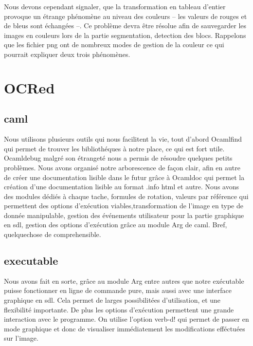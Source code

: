 \documentclass[]{report}
\begin{document}
        Nous devons cependant signaler, que la transformation en tableau d'entier provoque un étrange phénomène au niveau des
        couleurs -- les valeurs de rouges et de bleus sont échangées --. Ce problème devra être résolue afin de sauvegarder
        les images en couleurs lors de la partie segmentation, detection des blocs. Rappelons que les fichier png ont de
        nombreux modes de gestion de la couleur ce qui pourrait expliquer deux trois phénomènes.

        \section{OCRed}
        \subsection{caml}
         Nous utilisons plusieurs outils qui nous facilitent la vie, tout d'abord Ocamlfind qui permet de trouver les bibliothéques à notre place, ce qui est fort utile. Ocamldebug malgré son étrangeté nous a permis de résoudre quelques petits problèmes.
         Nous avons organisé notre arborescence de façon clair, afin en autre de créer une documentation lisible dans le futur grâce à Ocamldoc qui permet la création d'une documentation lisible au format .info html et autre.
         Nous avons des modules dédiés à chaque tache, formules de rotation, valeurs par référence qui permettent des options d'exécution viables,transformation de l'image en type de donnée manipulable, gestion des événements utilisateur pour la partie graphique en sdl, gestion des options d'exécution grâce au module Arg de caml.
         Bref, quelquechose de comprehensible.
        \subsection{executable}
        Nous avons fait en sorte, grâce au module Arg entre autres que notre exécutable puisse fonctionner en ligne de commande pure, mais aussi avec une interface graphique en sdl. Cela permet de larges possibilitées d'utilisation, et une flexibilité importante.
        De plus les options d'exécution permettent une grande interaction avec le programme. On utilise l'option \!verb-d! qui permet de passer en mode graphique et donc de visualiser immédiatement les modifications efféctuées sur l'image.
\end{document}

